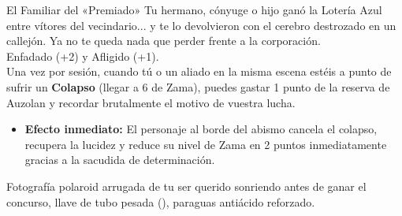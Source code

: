 \begin{FichaArquetipo}{El Familiar del «Premiado»}
Tu hermano, cónyuge o hijo ganó la Lotería Azul entre vítores del vecindario... y te lo devolvieron con el cerebro destrozado en un callejón. Ya no te queda nada que perder frente a la corporación.\\
 Enfadado (+2) y Afligido (+1).\\
 Una vez por sesión, cuando tú o un aliado en la misma escena estéis a punto de sufrir un \textbf{Colapso} (llegar a 6 de Zama), puedes gastar 1 punto de la reserva de Auzolan y recordar brutalmente el motivo de vuestra lucha.
\begin{itemize}
  \item \textbf{Efecto inmediato:} El personaje al borde del abismo cancela el colapso, recupera la lucidez y reduce su nivel de Zama en 2 puntos inmediatamente gracias a la sacudida de determinación.
\end{itemize}
 Fotografía polaroid arrugada de tu ser querido sonriendo antes de ganar el concurso, llave de tubo pesada (), paraguas antiácido reforzado.
\end{FichaArquetipo}
